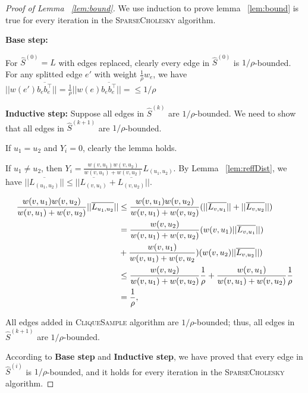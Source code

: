 \documentclass[11pt]{article}
\newcommand{\csamp}{\textsc{CliqueSample }}
\newcommand{\sparsecholesky}{\textsc{SparseCholesky }}
\newcommand{\lnorm}[1]{\ensuremath{\overline{#1}}}
\begin{document}
\begin{proof}[Proof of Lemma ~\ref{lem:bound}]

We use induction to prove lemma ~\ref{lem:bound} is true for every iteration in the \sparsecholesky algorithm. 

\textbf{Base step:}

For $\widehat{S}^{(0)} = L$ with edges replaced, clearly every edge in $\widehat{S}^{(0)}$ is $1/\rho$-bounded. For any splitted edge $e'$ with weight $\frac{1}{\rho} w_e$, we have $|| w(e') \lnorm{b_{e} b_{e}^\top} || = \frac{1}{\rho}|| w(e) \lnorm{b_{e} b_{e}^\top} || = \leq 1/\rho$


\textbf{Inductive step:}
Suppose all edges in $\widehat{S}^{(k)}$ are $1/\rho$-bounded. We need to show that all edges in $\widehat{S}^{(k+1)}$ are $1/\rho$-bounded.

If $u_1 = u_2$ and $Y_i = 0$, clearly the lemma holds.

If $u_1 \neq u_2$, then $Y_i = \frac{w(v,u_1)w(v,u_2)}{w(v,u_1) + w(v,u_2)}L_{(u_1,u_2)}$. By Lemma ~\ref{lem:reffDist}, we have $||\lnorm{L_{(u_1,u_2)}}|| \leq ||\lnorm{L_{(v,u_1)}} + \lnorm{L_{(v,u_2)}} || $.

\begin{align*}
	\frac{w(v,u_{1})w(v,u_{2})}{w(v,u_{1}) + w(v,u_{2})}|| \lnorm{L_{u_{1}, u_{2}}} || &\leq \frac{w(v,u_{1})w(v,u_{2})}{w(v,u_{1}) + w(v,u_{2})}(|| \lnorm{L_{v, u_{1}}} || + || \lnorm{L_{v, u_{2}}}|| ) \\ 
	&= \frac{w(v,u_{2})}{w(v,u_{1}) + w(v,u_{2})}(w(v,u_{1}) || \lnorm{L_{v, u_{1}}} ||) \notag \\ &{}+ \frac{w(v,u_{1})}{w(v,u_{1}) + w(v,u_{2}})(w(v,u_{2})|| \lnorm{L_{v, u_{2}}} ||) \\
	&\leq \frac{w(v,u_{2})}{w(v,u_{1}) + w(v,u_{2})}\frac{1}{\rho} + \frac{w(v,u_{1})}{w(v,u_{1}) + w(v,u_{2})}\frac{1}{\rho} \\
	&= \frac{1}{\rho},
\end{align*}

All edges added in \csamp algorithm are $1/\rho$-bounded; thus, all edges in $\widehat{S}^{(k+1)}$ are $1/\rho$-bounded. 

According to \textbf{Base step} and \textbf{Inductive step}, we have proved that every edge in $\widehat{S}^{(i)}$ is $1/\rho$-bounded, and it holds for every iteration in the \sparsecholesky algorithm.

\end{proof}
\end{document}

